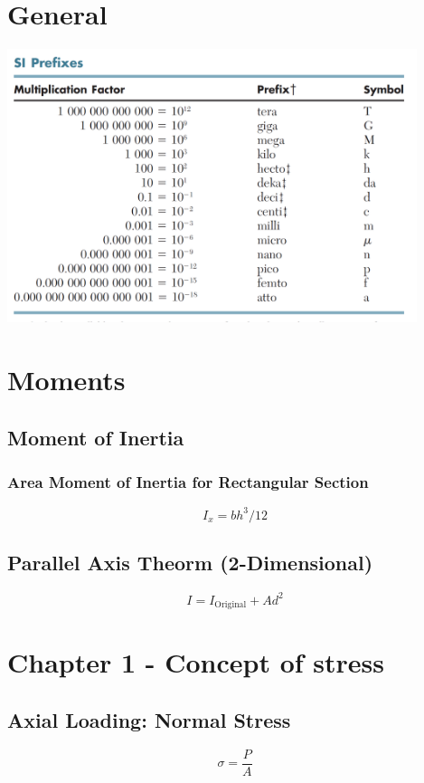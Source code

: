 \documentclass[10pt,landscape]{article}
\newenvironment{Figure}
     {\par\medskip\noindent\minipage{\linewidth}}
     {\endminipage\par\medskip}
\begin{document}
\begin{multicols}{3}
\section{General}
\begin{Figure}
    \centering
    \includegraphics[width=\linewidth, height=8cm]{SI_Prefix.png}
\end{Figure}

\section{Moments}
\subsection{Moment of Inertia}
\subsubsection{Area Moment of Inertia for Rectangular Section}
\begin{equation}
    I_x=bh^3/12
\end{equation}
\subsection{Parallel Axis Theorm (2-Dimensional)}
\begin{equation}
    I=I_{\text{Original}}+Ad^2
\end{equation}

\section{Chapter 1 - Concept of stress}
\subsection{Axial Loading: Normal Stress}
\begin{equation}
    \sigma=\frac{P}{A}
\end{equation}

\end{multicols}
\end{document}
